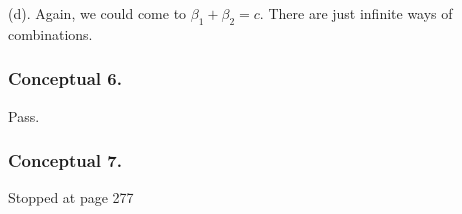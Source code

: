 (d). Again, we could come to $\beta_1 + \beta_2 = c$. There are just infinite ways of combinations.

\subsubsection{Conceptual 6.}
Pass.

\subsubsection{Conceptual 7.}

Stopped at page 277
